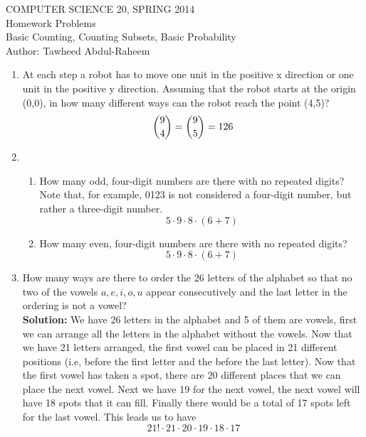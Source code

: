 \documentclass[12pt]{article}
\begin{document}
\begin{center}
    COMPUTER SCIENCE 20, SPRING 2014 \\
    Homework Problems\\
    Basic Counting, Counting Subsets, Basic Probability \\
    Author: Tawheed Abdul-Raheem
\end{center}

\smallskip

\begin{enumerate}

    \item At each step a robot has to move one unit in the positive x direction or one unit in the positive y direction. Assuming that the robot starts at the origin (0,0), in how many different ways can the robot reach the point (4,5)? \\
        \[ \dbinom{9}{4} = \dbinom{9}{5} = 126 \]
    \item 
        \begin{enumerate}
            \item How many odd, four-digit numbers are there with no repeated digits? Note that, for example, 0123 is not considered a four-digit number, but rather a three-digit number. \\
                \[5 \cdot9\cdot8\cdot(6+7) \]
            \item How many even, four-digit numbers are there with no repeated digits? \\
                \[ 5\cdot9\cdot8\cdot(6+7) \]
        \end{enumerate}

    \item How many ways are there to order the 26 letters of the alphabet so that no two of the vowels $a, e, i, o, u$ appear consecutively and the last letter in the ordering is not a vowel? \\
        \textbf{Solution: } We have 26 letters in the alphabet and 5 of them are vowels, first we can arrange all the letters in the alphabet without the vowels. Now that we have 21 letters arranged, the first vowel can be placed in 21 different positions (i.e, before the first letter and the before the last letter). Now that the first vowel has taken a spot, there are $20$ different places that we can place the next vowel. Next we have 19 for the next vowel, the next vowel will have 18 spots that it can fill. Finally there would be a total of 17 spots left for the last vowel. This leads us to have  \[ 21! \cdot 21 \cdot 20 \cdot 19 \cdot 18 \cdot 17 \]


\end{enumerate}
\end{document}
